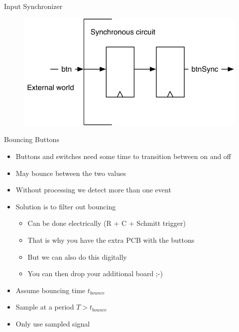 \begin{frame}[fragile]{Input Synchronizer}
\begin{figure}
  \includegraphics[scale=\scale]{../figures/synchronizer}
\end{figure}
\end{frame}

\begin{frame}[fragile]{Bouncing Buttons}
\begin{itemize}
\item Buttons and switches need some time to transition between on and off
\item May bounce between the two values
\item Without processing we detect more than one event
\item Solution is to filter out bouncing
\begin{itemize}
\item Can be done electrically (R + C + Schmitt trigger)
\item That is why you have the extra PCB with the buttons
\item But we can also do this digitally
\item You can then drop your additional board ;-)
\end{itemize}
\item Assume  bouncing time $t_{bounce}$
\item Sample at a period $T > t_{bounce}$
\item Only use sampled signal
\end{itemize}
\end{frame}


